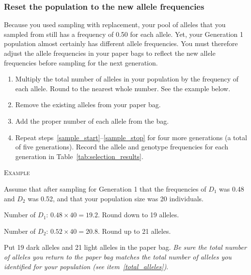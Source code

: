 \documentclass[12pt]{exam}
\newcommand{\allele}[1]{$#1$}
\begin{document}
\subsubsection*{Reset the population to the new allele frequencies}

Because you used sampling with replacement, your pool of alleles that 
you sampled from still has a frequency of 0.50 for each 
allele. Yet, your Generation 1 population almost certainly has 
different allele frequencies.  You must therefore adjust the
allele frequencies in your paper bags to reflect the new allele 
frequencies before sampling for the next generation.

\begin{enumerate} [resume]

	\item Multiply the total number of alleles in your population by the frequency of each allele. Round to the nearest whole number. See the example below.
	
	\item Remove the existing alleles from your paper bag.
	
	\item \label{sample_stop} Add the proper number of each allele from the bag.
	
	\item Repeat steps~\ref{sample_start}–\ref{sample_stop} for four more generations (a total of five generations). Record the allele and genotype frequencies for each generation in Table~\ref{tab:selection_results}. %
	
\end{enumerate} 

	\medskip
	
	\textsc{Example} 
	
	Assume that after sampling for Generation 1 that the frequencies of \allele{D_1} was 0.48 and \allele{D_2} was 0.52, and that your population size was 20 individuals.
	
	Number of \allele{D_1}: $0.48 \times 40 = 19.2.$ Round down to 19 alleles.
	
	Number of \allele{D_2}: $0.52 \times 40 = 20.8.$ Round up to 21 alleles.
	
	Put 19 dark alleles and 21 light alleles in the paper bag. \emph{Be sure the total
		number of alleles you return to the paper bag matches the total number 
		of alleles you identified for your population (see item~\ref{total_alleles})}.
\end{document}
